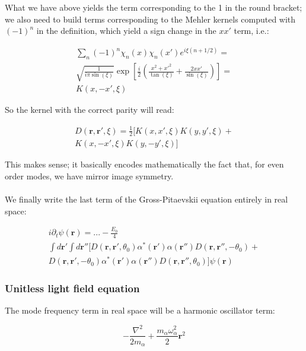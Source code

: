 \documentclass[a4paper,twocolumn,nobalancelastpage]{revtex4-1}
\newcommand{\vect}[1]{\mathbf{#1}}
\begin{document}
What we have above yields the term corresponding to the 1 in the round bracket; we also need to build terms corresponding to the Mehler kernels computed with $(-1)^n$ in the definition, which yield a sign change in the $xx'$ term, i.e.:

\begin{multline}
\sum_{n} (-1)^n \chi_n (x) \chi_n (x') e^{i\xi(n+1/2)}= \\\sqrt{\frac{1}{i \pi \sin(\xi)}} \exp{\left[ \frac{i }{2 } \left(
\frac{x^2+x'^2}{\tan(\xi)}+\frac{2 x x'}{\sin(\xi)}  
\right) \right] } =
\\ K(x,-x',\xi)
\end{multline}

So the kernel with the correct parity will read:

\begin{multline}
\label{eq:integralkernelD}
D(\textbf{r},\textbf{r}',\xi)=\frac{1}{2} \big[ K(x,x',\xi)K(y,y',\xi)+ \\ K(x,-x',\xi)K(y,-y',\xi) \big]
\end{multline}


This makes sense; it basically encodes mathematically the fact that, for even order modes, we have mirror image symmetry.
\\
\\
We finally write the last term of the Gross-Pitaevskii equation entirely in real space:

\begin{multline}
i\partial_t \psi(\textbf{r})= ... - \frac{E_0}{4} \\  \int d\textbf{r}' \int d\textbf{r}'' \bigg[
D(\textbf{r},\textbf{r}',\theta_0) \alpha^*(\textbf{r}') \alpha(\textbf{r}'')  D(\textbf{r}, \textbf{r}'',-\theta_0)
+ \\
D(\textbf{r},\textbf{r}',-\theta_0) \alpha^*(\textbf{r}') \alpha(\textbf{r}'')  D(\textbf{r}, \textbf{r}'',\theta_0) \bigg] \psi(\vect{r})
\end{multline}

\subsubsection{Unitless light field equation}

The mode frequency term in real space will be a harmonic oscillator term:

\begin{equation}
-\frac{\nabla^2}{2m_{\alpha}}+ \frac{m_{\alpha} \omega_{\alpha}^2}{2} \vect{r}^2
\end{equation}
\end{document}
